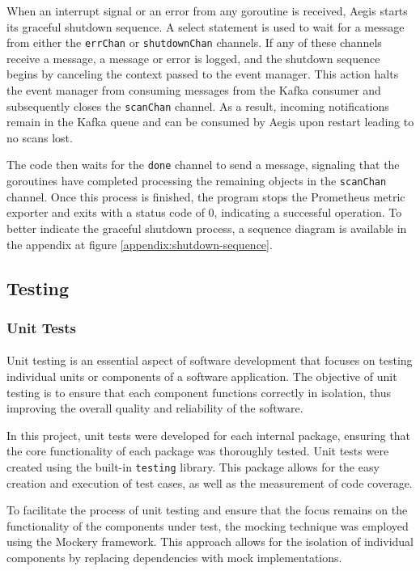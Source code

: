 \documentclass[12pt, conference, final, a4paper, onecolumn, compsoc]{IEEEtran}
\begin{document}
When an interrupt signal or an error from any goroutine is received, Aegis
starts its graceful shutdown sequence. A select statement is used to wait for a
message from either the \texttt{errChan} or \texttt{shutdownChan} channels. If
any of these channels receive a message, a message or error is logged, and the
shutdown sequence begins by canceling the context passed to the event manager.
This action halts the event manager from consuming messages from the Kafka
consumer and subsequently closes the \texttt{scanChan} channel. As a result,
incoming notifications remain in the Kafka queue and can be consumed by Aegis
upon restart leading to no scans lost.

The code then waits for the \texttt{done} channel to send a message, signaling
that the goroutines have completed processing the remaining objects in the
\texttt{scanChan} channel. Once this process is finished, the program stops the
Prometheus metric exporter and exits with a status code of 0, indicating a
successful operation. To better indicate the graceful shutdown process, a
sequence diagram is available in the appendix at figure
\ref{appendix:shutdown-sequence}.

\subsection{Testing}

\subsubsection*{Unit Tests}
\paragraph{}

Unit testing is an essential aspect of software development that focuses on
testing individual units or components of a software application. The objective
of unit testing is to ensure that each component functions correctly in
isolation, thus improving the overall quality and reliability of the software.

In this project, unit tests were developed for each internal package, ensuring
that the core functionality of each package was thoroughly tested. Unit tests
were created using the built-in \texttt{testing} library. This package allows
for the easy creation and execution of test cases, as well as the measurement of
code coverage.

To facilitate the process of unit testing and ensure that the focus remains on
the functionality of the components under test, the mocking technique was
employed using the Mockery framework. This approach allows for the isolation of
individual components by replacing dependencies with mock implementations.
\end{document}
